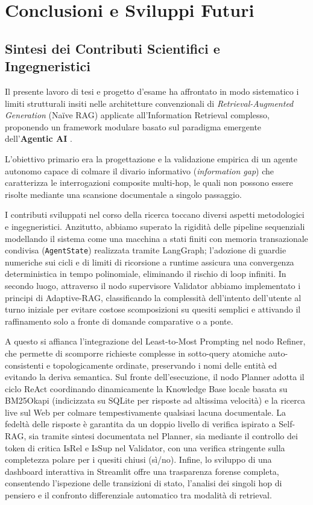 \chapter{Conclusioni e Sviluppi Futuri}
\label{chap:conclusioni}

\section{Sintesi dei Contributi Scientifici e Ingegneristici}
\label{sec:sintesi_contributi}

Il presente lavoro di tesi e progetto d'esame ha affrontato in modo sistematico i limiti strutturali insiti nelle architetture convenzionali di \textit{Retrieval-Augmented Generation} (Naïve RAG) applicate all'Information Retrieval complesso, proponendo un framework modulare basato sul paradigma emergente dell'\textbf{Agentic AI} \cite{zhang2024ai, wu2025agentic}. 

L'obiettivo primario era la progettazione e la validazione empirica di un agente autonomo capace di colmare il divario informativo (\textit{information gap}) che caratterizza le interrogazioni composite multi-hop, le quali non possono essere risolte mediante una scansione documentale a singolo passaggio.

I contributi sviluppati nel corso della ricerca toccano diversi aspetti metodologici e ingegneristici. Anzitutto, abbiamo superato la rigidità delle pipeline sequenziali modellando il sistema come una macchina a stati finiti con memoria transazionale condivisa (\texttt{AgentState}) realizzata tramite LangGraph; l'adozione di guardie numeriche sui cicli e di limiti di ricorsione a runtime assicura una convergenza deterministica in tempo polinomiale, eliminando il rischio di loop infiniti. In secondo luogo, attraverso il nodo supervisore Validator abbiamo implementato i principi di Adaptive-RAG, classificando la complessità dell'intento dell'utente al turno iniziale per evitare costose scomposizioni su quesiti semplici e attivando il raffinamento solo a fronte di domande comparative o a ponte.

A questo si affianca l'integrazione del Least-to-Most Prompting nel nodo Refiner, che permette di scomporre richieste complesse in sotto-query atomiche auto-consistenti e topologicamente ordinate, preservando i nomi delle entità ed evitando la deriva semantica. Sul fronte dell'esecuzione, il nodo Planner adotta il ciclo ReAct coordinando dinamicamente la Knowledge Base locale basata su BM25Okapi (indicizzata su SQLite per risposte ad altissima velocità) e la ricerca live sul Web per colmare tempestivamente qualsiasi lacuna documentale. La fedeltà delle risposte è garantita da un doppio livello di verifica ispirato a Self-RAG, sia tramite sintesi documentata nel Planner, sia mediante il controllo dei token di critica $\text{IsRel}$ e $\text{IsSup}$ nel Validator, con una verifica stringente sulla completezza polare per i quesiti chiusi (sì/no). Infine, lo sviluppo di una dashboard interattiva in Streamlit offre una trasparenza forense completa, consentendo l'ispezione delle transizioni di stato, l'analisi dei singoli hop di pensiero e il confronto differenziale automatico tra modalità di retrieval.

